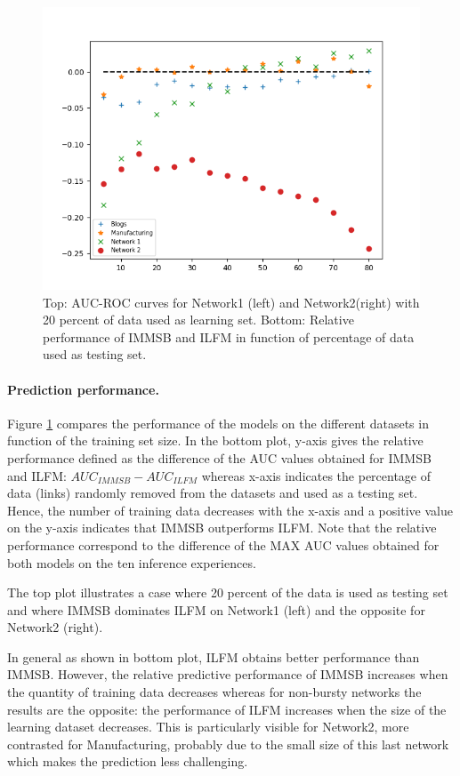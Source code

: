 \begin{figure}[h]
\begin{minipage}{0.4\textwidth}
        \includegraphics[width=\textwidth]{img/corpus/testset_max_20.png}
    \end{minipage}
    \caption{Top: AUC-ROC curves for Network1 (left) and Network2(right) with 20 percent of data used as learning set. Bottom: Relative performance of IMMSB and ILFM in function of percentage of data used as testing set.} 
\label{fig:auc}
\end{figure}


\paragraph{Prediction performance.}

Figure \ref{fig:auc} compares the performance  of the models on the different datasets in function of the training set size. In the bottom plot,  y-axis gives the relative performance defined as the difference of the AUC values obtained for IMMSB and ILFM: $AUC_{IMMSB} - AUC_{ILFM}$ whereas x-axis indicates the percentage of data (links) randomly removed from the datasets and  used as a testing set. Hence, the number of training data decreases with the x-axis and a positive value on the y-axis indicates that IMMSB outperforms ILFM.  Note that the relative performance correspond to the difference of the MAX AUC values obtained for both models on the ten inference experiences.

The top plot illustrates a case where 20 percent of the data is used as testing set and where IMMSB dominates ILFM on Network1 (left) and the opposite for Network2 (right).

In general as shown in bottom plot, ILFM obtains better performance than IMMSB. However, the relative predictive performance of IMMSB  increases  when the quantity of training data decreases whereas for non-bursty networks the results are the opposite: the performance of ILFM increases when the size of the learning dataset decreases. This is particularly visible for Network2, more contrasted for Manufacturing, probably due to the small size of this last network which makes the prediction less challenging.


